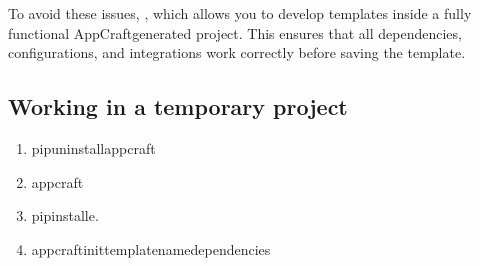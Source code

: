 \documentclass[letterpaper,10pt,english]{sphinxhowto}
\begin{document}
\sphinxAtStartPar
To avoid these issues, , which allows you to develop templates inside a fully functional AppCraft\sphinxhyphen{}generated project. This ensures that all dependencies, configurations, and integrations work correctly before saving the template.


\subsection{Working in a temporary project}
\label{\detokenize{contributing/index:id6}}
\sphinxAtStartPar
{}
\begin{enumerate}
%
\item {} \begin{description}
\begin{sphinxVerbatim}[commandchars=\\\{\}]
pipuninstallappcraft
\end{sphinxVerbatim}

\end{description}

\item {} \begin{description}
\begin{sphinxVerbatim}[commandchars=\\\{\}]
appcraft
\end{sphinxVerbatim}

\end{description}

\item {} \begin{description}
\begin{sphinxVerbatim}[commandchars=\\\{\}]
pipinstall\PYGZhy{}e.
\end{sphinxVerbatim}

\end{description}

\item {} \begin{description}
\begin{sphinxVerbatim}[commandchars=\\\{\}]
appcraftinit\PYGZlt{}template\PYGZus{}name\PYGZgt{}\PYG{o}{[}dependencies\PYG{o}{]}
\end{sphinxVerbatim}


\end{description}
\end{enumerate}
\end{document}
